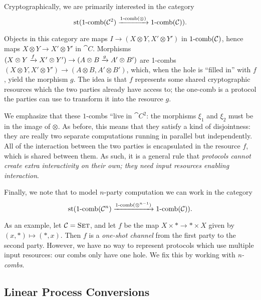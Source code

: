 Cryptographically, we are primarily interested in the category \[
  \operatorname*{st}(\operatorname*{1-comb}({\mathcal{C}}^2)\xrightarrow{\operatorname*{1-comb}(\otimes)}\operatorname*{1-comb}({\mathcal{C}})).
\]

Objects in this category are maps $I\to (X\otimes Y, X'\otimes Y')$ in
$\operatorname*{1-comb}({\mathcal{C}})$, hence maps $X\otimes Y\to X'\otimes Y'$ in $\cat{C}$.
Morphisms $(X\otimes Y\xrightarrow{f} X'\otimes Y')\to(A\otimes B\xrightarrow{g} A'\otimes B')$
are 1-combs $(X\otimes Y, X'\otimes Y')\to (A\otimes B, A'\otimes B')$, which,
when the hole is ``filled in'' with $f$, yield the morphism $g$. The idea is
that $f$ represents some shared cryptographic resources which the two parties
already have access to; the one-comb is a protocol the parties can use to
transform it into the resource $g$.

We emphasize that these $1$-combs ``live in $\cat{C}^2$: the morphisms $\xi_1$
and $\xi_2$ must be in the image of $\otimes$. As before, this means that they
satisfy a kind of disjointness: they are really two separate computations
running in parallel but independently. All of the interaction between the two
parties is encapsulated in the resource $f$, which is shared between them. As
such, it is a general rule that \emph{protocols cannot create extra
  interactivity on their own; they need input resources enabling interaction}.

Finally, we note that to model $n$-party computation we can work in the category \[
  \operatorname*{st}(\operatorname*{1-comb}({\mathcal{C}}^n)\xrightarrow{\operatorname*{1-comb}(\otimes^{n-1})}\operatorname*{1-comb}({\mathcal{C}})).
\]

As an example, let ${\mathcal{C}} = {\textsc{\text{Set}}}$, and let $f$ be the map $X\times *\to
*\times X$ given by $(x, *)\mapsto (*, x)$. Then $f$ is a \emph{one-shot channel}
from the first party to the second party. However, we have no way to represent
protocols which use multiple input resources: our combs only have one hole. We
fix this by working with \emph{n-combs}.

\subsection{Linear Process Conversions}
\label{sec:libear-process-conversions}

